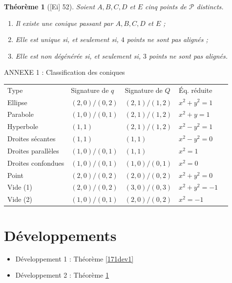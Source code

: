 \documentclass[10pt, a4paper, parskip=full, twoside, twocolumn]{report}
\newtheorem{theorem}[definition]{Théorème}
\begin{document}
\begin{tcolorbox}[
    breakable, %
    colback=developpement, %
    colframe=gray!0!black, %
    boxrule=0pt, %
    arc=1mm, %
	boxsep=0pt,
	left=0pt, right=0pt, top=0pt, bottom=0pt
]
\begin{theorem}[\textnormal{[Ei] 52}]
	\label{171dev2}
	Soient $A,B,C,D$ et $E$ cinq points de $\mathcal{P}$ distincts.
	\begin{enumerate}
		\item Il existe une conique passant par $A,B,C,D$ et $E$ ;
		\item Elle est unique si, et seulement si, $4$ points ne sont pas alignés ;
		\item Elle est non dégénérée si, et seulement si, $3$ points ne sont pas alignés.
	\end{enumerate}
\end{theorem}
\end{tcolorbox}

ANNEXE 1 : Classification des coniques
\begin{table}[]
\begin{tabular}{|l|l|l|l|l|}
Type & Signature de $q$ & Signature de $Q$ & Éq. réduite \\
Ellipse & $(2,0) / (0,2)$ & $(2,1) / (1,2)$ & $x^2+y^2 = 1$ \\
Parabole & $(1,0) / (0,1)$ & $(2,1)/(1,2)$ &  $x^2 +y=1$\\
Hyperbole & $(1,1)$  & $(2,1)/(1,2)$ & $x^2-y^2=1$\\
Droites sécantes & $(1,1)$ &  $(1,1)$ & $x^2-y^2=0$\\
Droites parallèles & $(1,0)/(0,1)$ & $(1,1)$ & $x^2 = 1$\\
Droites confondues & $(1,0)/(0,1)$ & $(1,0)/(0,1)$ & $x^2 = 0$ \\
Point & $(2,0) / (0,2)$ & $(2,0)/(0,2)$ & $x^2+y^2 = 0$ \\
Vide (1) & $(2,0) / (0,2)$ & $(3,0)/(0,3)$ & $x^2 + y^2 = -1$\\
Vide (2) & $(1,0) / (0,1)$ & $(2,0)/(0,2)$ & $x^2 = -1$
\end{tabular}
\end{table}

\section*{Développements}
\begin{itemize}
	\item Développement 1 : Théorème \ref{171dev1}
	\item Développement 2 : Théorème \ref{171dev2}
\end{itemize}
\end{document}
